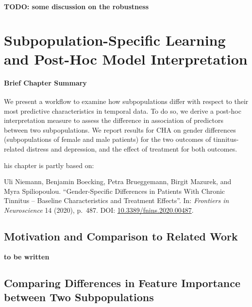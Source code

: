 \documentclass[
  oneside]{book}
\newenvironment{infobox}[1]
  {
  \begin{chapter-summary}
  }
  {
  \end{chapter-summary}
  }
\begin{document}
\textbf{TODO: some discussion on the robustness}

\hypertarget{gender}{%
\chapter{Subpopulation-Specific Learning and Post-Hoc Model Interpretation}\label{gender}}

\begin{infobox}{tasks.pdf}

\hypertarget{brief-chapter-summary-6}{%
\subsubsection*{Brief Chapter Summary}\label{brief-chapter-summary-6}}

We present a workflow to examine how subpopulations differ with respect to their most predictive characteristics in temporal data. To do so, we derive a post-hoc interpretation measure to assess the difference in association of predictors between two subpopulations. We report results for CHA on gender differences (subpopulations of female and male patients) for the two outcomes of tinnitus-related distress and depression, and the effect of treatment for both outcomes.

\end{infobox}

\begin{infobox}

This chapter is partly based on:

Uli Niemann, Benjamin Boecking, Petra Brueggemann, Birgit Mazurek, and Myra Spiliopoulou. ``Gender-Specific Differences in Patients With Chronic Tinnitus -- Baseline Characteristics and Treatment Effects''. In: \emph{Frontiers in Neuroscience} 14 (2020), p.~487. DOI: \href{https://doi.org/10.3389\%2Ffnins.2020.00487}{10.3389/fnins.2020.00487}.

\end{infobox}

\hypertarget{gender-intro}{%
\section{Motivation and Comparison to Related Work}\label{gender-intro}}

\textbf{to be written}

\hypertarget{gender-measure}{%
\section{Comparing Differences in Feature Importance between Two Subpopulations}\label{gender-measure}}
\end{document}
